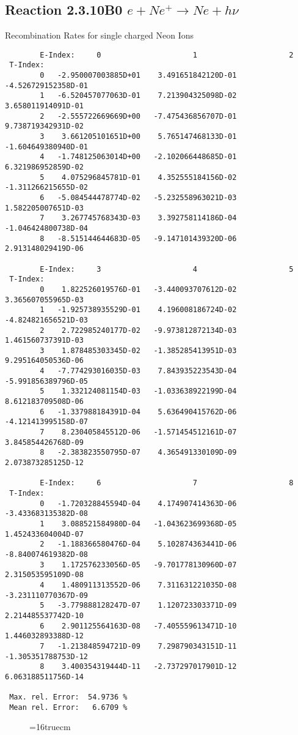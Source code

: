 \documentclass[12pt]{article}
\begin{document}
\subsection{
Reaction 2.3.10B0   $e + Ne^+ \rightarrow  Ne + h\nu$
}

 Recombination Rates for single
 charged Neon Ions

\begin{small}\begin{verbatim}
        E-Index:     0                     1                     2
 T-Index:
        0   -2.950007003885D+01    3.491651842120D-01   -4.526729152358D-01
        1   -6.520457077063D-01    7.213904325098D-02    3.658011914091D-01
        2   -2.555722669669D+00   -7.475436856707D-01    9.738719342931D-02
        3    3.661205101651D+00    5.765147468133D-01   -1.604649380940D-01
        4   -1.748125063014D+00   -2.102066448685D-01    6.321986952859D-02
        5    4.075296845781D-01    4.352555184156D-02   -1.311266215655D-02
        6   -5.084544478774D-02   -5.232558963021D-03    1.582205007651D-03
        7    3.267745768343D-03    3.392758114186D-04   -1.046424800738D-04
        8   -8.515144644683D-05   -9.147101439320D-06    2.913148029419D-06

        E-Index:     3                     4                     5
 T-Index:
        0    1.822526019576D-01   -3.440093707612D-02    3.365607055965D-03
        1   -1.925738935529D-01    4.196008186724D-02   -4.824821656521D-03
        2    2.722985240177D-02   -9.973812872134D-03    1.461560737391D-03
        3    1.878485303345D-02   -1.385285413951D-03    9.295164050536D-06
        4   -7.774293016035D-03    7.843935223543D-04   -5.991856389796D-05
        5    1.332124081154D-03   -1.033638922199D-04    8.612183709508D-06
        6   -1.337988184391D-04    5.636490415762D-06   -4.121413995158D-07
        7    8.230405845512D-06   -1.571454512161D-07    3.845854426768D-09
        8   -2.383823550795D-07    4.365491330109D-09    2.073873285125D-12

        E-Index:     6                     7                     8
 T-Index:
        0   -1.720328845594D-04    4.174907414363D-06   -3.433683135382D-08
        1    3.088521584980D-04   -1.043623699368D-05    1.452433604004D-07
        2   -1.188366580476D-04    5.102874363441D-06   -8.840074619382D-08
        3    1.172576233056D-05   -9.701778130960D-07    2.315053595109D-08
        4    1.480911313552D-06    7.311631221035D-08   -3.231110770367D-09
        5   -3.779888128247D-07    1.120723303371D-09    2.214485537742D-10
        6    2.901125564163D-08   -7.405559613471D-10    1.446032893388D-12
        7   -1.213848594721D-09    7.298790343151D-11   -1.305351788753D-12
        8    3.400354319444D-11   -2.737297017901D-12    6.063188511756D-14

 Max. rel. Error:  54.9736 %
 Mean rel. Error:   6.6709 %

\end{verbatim}\end{small}
\begin{figure} \label{2.3.10B0}
\epsfxsize=16truecm
\end{figure}
\newpage
\end{document}

